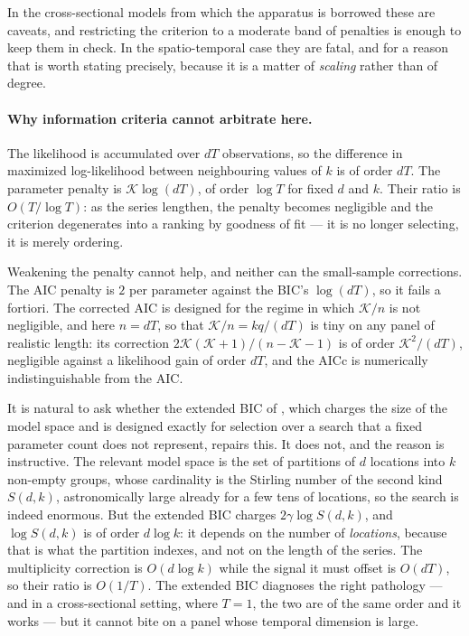 In the cross-sectional models from which the apparatus is borrowed these are caveats, and restricting the criterion to a moderate band of penalties is enough to keep them in check. In the spatio-temporal case they are fatal, and for a reason that is worth stating precisely, because it is a matter of \emph{scaling} rather than of degree.

\paragraph{Why information criteria cannot arbitrate here.} The likelihood is accumulated over $dT$ observations, so the difference in maximized log-likelihood between neighbouring values of $k$ is of order $dT$. The parameter penalty is $\mathcal{K}\log(dT)$, of order $\log T$ for fixed $d$ and $k$. Their ratio is $O(T/\log T)$: as the series lengthen, the penalty becomes negligible and the criterion degenerates into a ranking by goodness of fit --- it is no longer selecting, it is merely ordering.

Weakening the penalty cannot help, and neither can the small-sample corrections. The AIC penalty is $2$ per parameter against the BIC's $\log(dT)$, so it fails a fortiori. The corrected AIC is designed for the regime in which $\mathcal{K}/n$ is not negligible, and here $n = dT$, so that $\mathcal{K}/n = kq/(dT)$ is tiny on any panel of realistic length: its correction $2\mathcal{K}(\mathcal{K}+1)/(n - \mathcal{K} - 1)$ is of order $\mathcal{K}^2/(dT)$, negligible against a likelihood gain of order $dT$, and the AICc is numerically indistinguishable from the AIC.

It is natural to ask whether the extended BIC of \citet{ChenChen2008}, which charges the size of the model space and is designed exactly for selection over a search that a fixed parameter count does not represent, repairs this. It does not, and the reason is instructive. The relevant model space is the set of partitions of $d$ locations into $k$ non-empty groups, whose cardinality is the Stirling number of the second kind $S(d,k)$, astronomically large already for a few tens of locations, so the search is indeed enormous. But the extended BIC charges $2\gamma \log S(d,k)$, and $\log S(d,k)$ is of order $d\log k$: it depends on the number of \emph{locations}, because that is what the partition indexes, and not on the length of the series. The multiplicity correction is $O(d \log k)$ while the signal it must offset is $O(dT)$, so their ratio is $O(1/T)$. The extended BIC diagnoses the right pathology --- and in a cross-sectional setting, where $T = 1$, the two are of the same order and it works --- but it cannot bite on a panel whose temporal dimension is large.

